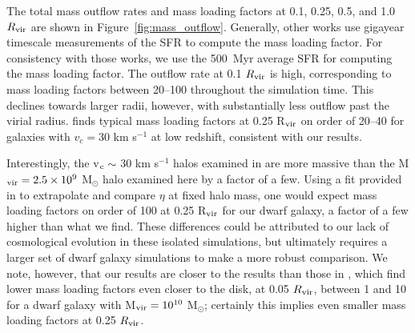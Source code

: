 \documentclass[fleqn,usenatbib,useAMS]{mnras}
\begin{document}
The total mass outflow rates and mass loading factors at 0.1, 0.25, 0.5, and 1.0 $R_{\rm vir}$ are shown in Figure~\ref{fig:mass_outflow}. Generally, other works use gigayear timescale measurements of the SFR to compute the mass loading factor. For consistency with those works, we use the 500~Myr average SFR for computing the mass loading factor. The outflow rate at 0.1 $R_{\rm vir}$ is high, corresponding to mass loading factors between 20--100 throughout the simulation time. This declines towards larger radii, however, with substantially less outflow past the virial radius. \citet{Muratov2015} finds typical mass loading factors at 0.25 R$_{\rm vir}$ on order of 20--40 for galaxies with $v_{c} = 30$ km s$^{-1}$ at low redshift, consistent with our results.

Interestingly, the v$_{\rm c}\sim$ 30 km s$^{-1}$ halos examined in \citet{Muratov2015} are more massive than the M$_{\rm vir} = 2.5\times 10^9$ M$_{\odot}$ halo examined here by a factor of a few. Using a fit provided in \citet{Muratov2015} to extrapolate and compare $\eta$ at fixed halo mass, one would expect mass loading factors on order of 100 at 0.25 R$_{\rm vir}$ for our dwarf galaxy, a factor of a few higher than what we find. These differences could be attributed to our lack of cosmological evolution in these isolated simulations, but ultimately requires a larger set of dwarf galaxy simulations to make a more robust comparison. We note, however, that our results are closer to the \citet{Muratov2015} results than those in \citet{Hu2016,Hu2017}, which find lower mass loading factors even closer to the disk, at 0.05 $R_{\rm vir}$, between 1 and 10 for a dwarf galaxy with M$_{\rm vir} = 10^{10}$ M$_{\odot}$; certainly this implies even smaller mass loading factors at 0.25 $R_{\rm vir}$.
\end{document}
